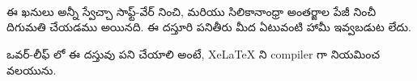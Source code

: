 \begin{center}
{\\


\\


\\


\\


\\


\\


\\


\\
}
\end{center}

ఈ ఖనులు అన్నీ స్వేచ్చా సాఫ్ట్-వేర్ నించి, మరియు సిలికానాంధ్రా అంతర్జాల పేజీ నించీ దిగుమతి చేయడము అయినది. 
ఈ దస్తూరి పనితీరు మీద ఏటువంటి హామీ ఇవ్వబడుట లేదు.


ఒవర్-లీఫ్ లో ఈ దస్తువు పని చేయాలి అంటే, XeLaTeX ని compiler
 గా నియమించ వలయును.


